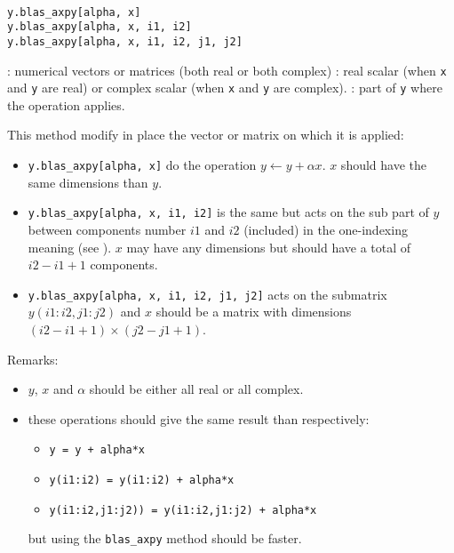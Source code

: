 \begin{mandesc}
  \\ 
\end{mandesc}
\begin{calling_sequence}
\begin{verbatim}
y.blas_axpy[alpha, x]
y.blas_axpy[alpha, x, i1, i2]
y.blas_axpy[alpha, x, i1, i2, j1, j2]
\end{verbatim}
\end{calling_sequence}
\begin{parameters}
  \begin{varlist}
    : numerical vectors or matrices (both real or both complex)
    : real scalar (when \verb+x+ and \verb+y+ are real) or complex scalar (when \verb+x+ and \verb+y+ 
                   are complex).
    : part of \verb+y+ where the operation applies.
  \end{varlist}
\end{parameters}

\begin{mandescription}

This method modify in place the vector or matrix on which it is applied:
\begin{itemize}
\item \verb+y.blas_axpy[alpha, x]+ do the operation $y \leftarrow y + \alpha x$.
      $x$ should have the same dimensions than $y$.
\item \verb+y.blas_axpy[alpha, x, i1, i2]+ is the same but acts on the sub part of 
      $y$ between components number $i1$ and $i2$ (included) in the one-indexing
      meaning  (see ). $x$ may have
      any dimensions but should have a total of $i2-i1+1$ components.
\item \verb+y.blas_axpy[alpha, x, i1, i2, j1, j2]+ acts on the submatrix $y(i1:i2,j1:j2)$
      and $x$ should be a matrix with dimensions $(i2-i1+1)\times(j2-j1+1)$.  
\end{itemize}
Remarks:
\begin{itemize} 
\item $y$, $x$ and $\alpha$ should be either all real or all complex.
\item these operations should give the same result than respectively:
      \begin{itemize}
      \item \verb-y = y + alpha*x-
      \item \verb-y(i1:i2) = y(i1:i2) + alpha*x-
      \item \verb-y(i1:i2,j1:j2)) = y(i1:i2,j1:j2) + alpha*x-
      \end{itemize}
      but using the \verb+blas_axpy+ method should be faster.
\end{itemize}
\end{mandescription}

